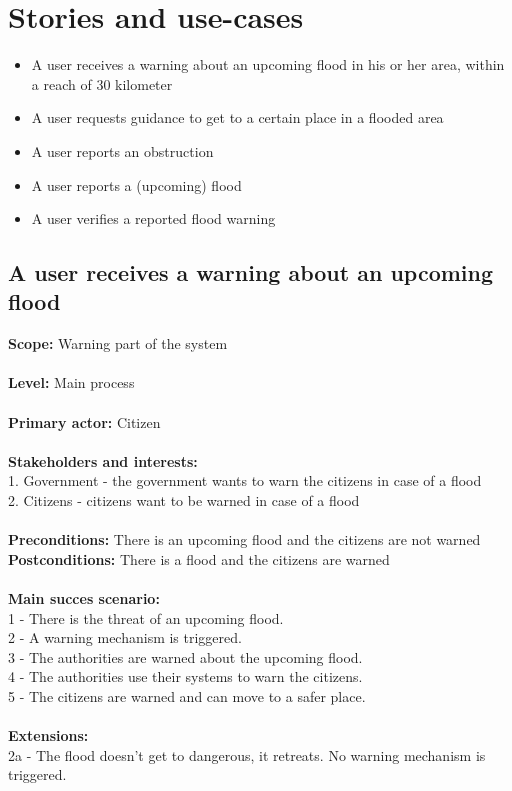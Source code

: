 \section{Stories and use-cases}
	\begin{itemize}
		\item A user receives a warning about an upcoming flood in his or her area, within a reach of 30 kilometer
		\item A user requests guidance to get to a certain place in a flooded area
		\item A user reports an obstruction
		\item A user reports a (upcoming) flood
		\item A user verifies a reported flood warning
	\end{itemize} 

\subsection{A user receives a warning about an upcoming flood}
\textbf{Scope:} Warning part of the system\\\\
\textbf{Level:} Main process\\\\
\textbf{Primary actor:} Citizen\\\\
\textbf{Stakeholders and interests:}\\
	1. Government - the government wants to warn the citizens in case of a flood \\
	2. Citizens - citizens want to be warned in case of a flood \\\\
\textbf{Preconditions:} There is an upcoming flood and the citizens are not warned\\
\textbf{Postconditions:} There is a flood and the citizens are warned\\\\
\textbf{Main succes scenario:} \\
1 - There is the threat of an upcoming flood.\\
2 - A warning mechanism is triggered.\\
3 - The authorities are warned about the upcoming flood.\\
4 - The authorities use their systems to warn the citizens.\\
5 - The citizens are warned and can move to a safer place.\\\\
\textbf{Extensions:} \\
2a - The flood doesn't get to dangerous, it retreats. No warning mechanism is triggered.


